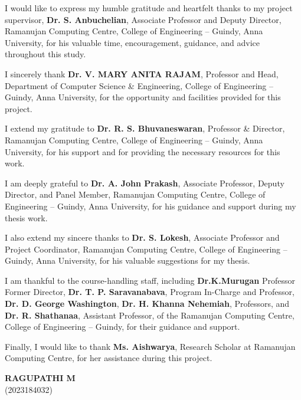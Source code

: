 \documentclass[12pt,a4paper]{report}
\begin{document}
 I would like to express my humble gratitude and heartfelt thanks to my project supervisor, \textbf{Dr. S. Anbuchelian}, Associate Professor and Deputy Director, Ramanujan Computing Centre, College of Engineering -- Guindy, Anna University, for his valuable time, encouragement, guidance, and advice throughout this study.
 
 \vspace{1em}
 
 I sincerely thank \textbf{Dr. V. MARY ANITA RAJAM}, Professor and Head, Department of Computer Science \& Engineering, College of Engineering -- Guindy, Anna University, for the opportunity and facilities provided for this project.
 
 \vspace{1em}
 
 I extend my gratitude to \textbf{Dr. R. S. Bhuvaneswaran}, Professor \& Director, Ramanujan Computing Centre, College of Engineering -- Guindy, Anna University, for his support and for providing the necessary resources for this work.
 
 \vspace{1em}
 
 I am deeply grateful to \textbf{Dr. A. John Prakash}, Associate Professor, Deputy Director, and Panel Member, Ramanujan Computing Centre, College of Engineering -- Guindy, Anna University, for his guidance and support during my thesis work.
 
 \vspace{1em}
 
 I also extend my sincere thanks to \textbf{Dr. S. Lokesh}, Associate Professor and Project Coordinator, Ramanujan Computing Centre, College of Engineering -- Guindy, Anna University, for his valuable suggestions for my thesis.
 
 \vspace{1em}
 
 I am thankful to the course-handling staff, including \textbf{Dr.K.Murugan} Professor
 Former Director, \textbf{Dr. T. P. Saravanabava}, Program In-Charge and Professor, \textbf{Dr. D. George Washington}, \textbf{Dr. H. Khanna Nehemiah}, Professors, and \textbf{Dr. R. Shathanaa}, Assistant Professor, of the Ramanujan Computing Centre, College of Engineering -- Guindy, for their guidance and support.
 
 \vspace{1em}
 
 Finally, I would like to thank \textbf{Ms. Aishwarya}, Research Scholar at Ramanujan Computing Centre, for her assistance during this project.
 
 
 
 \begin{flushright}
 	\textbf{RAGUPATHI M} \\
 	(2023184032)
 \end{flushright}
\end{document}
